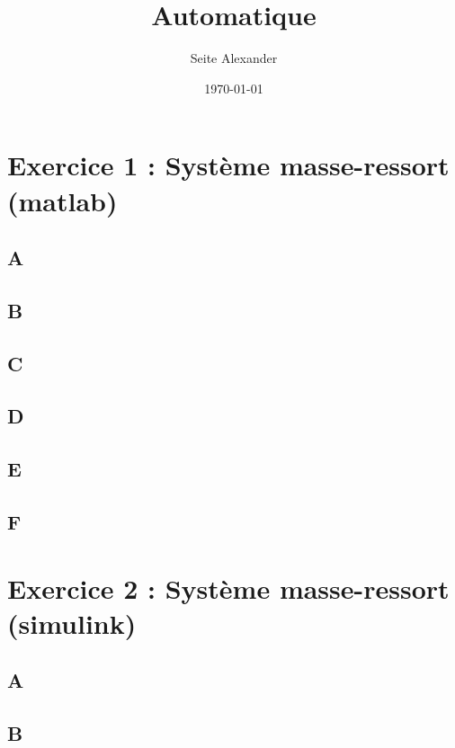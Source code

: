 \documentclass[letterpaper,12pt]{article}
\begin{document}
\title{Automatique}

\author{Seite Alexander}
\date{\today}
\maketitle
\newline

\tableofcontents

\newpage

\section{Exercice 1 : Système masse-ressort (matlab)}

\subsection{A}

\subsection{B}

\subsection{C}

\subsection{D}

\subsection{E}

\subsection{F}



\section{Exercice 2 : Système masse-ressort (simulink)}

\subsection{A}

\subsection{B}
\end{document}

